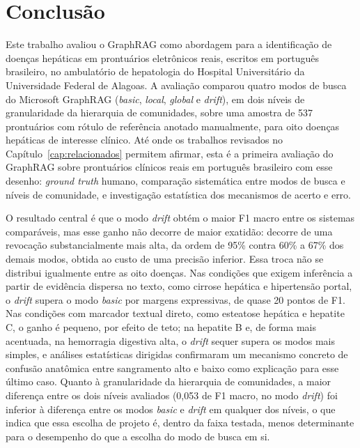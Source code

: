 \chapter{Conclusão}\label{cap:conclusao}

Este trabalho avaliou o GraphRAG como abordagem para a identificação de doenças hepáticas em prontuários eletrônicos reais, escritos em português brasileiro, no ambulatório de hepatologia do Hospital Universitário da Universidade Federal de Alagoas. A avaliação comparou quatro modos de busca do Microsoft GraphRAG (\textit{basic}, \textit{local}, \textit{global} e \textit{drift}), em dois níveis de granularidade da hierarquia de comunidades, sobre uma amostra de 537 prontuários com rótulo de referência anotado manualmente, para oito doenças hepáticas de interesse clínico. Até onde os trabalhos revisados no Capítulo~\ref{cap:relacionados} permitem afirmar, esta é a primeira avaliação do GraphRAG sobre prontuários clínicos reais em português brasileiro com esse desenho: \textit{ground truth} humano, comparação sistemática entre modos de busca e níveis de comunidade, e investigação estatística dos mecanismos de acerto e erro.

O resultado central é que o modo \textit{drift} obtém o maior F1 macro entre os sistemas comparáveis, mas esse ganho não decorre de maior exatidão: decorre de uma revocação substancialmente mais alta, da ordem de 95\% contra 60\% a 67\% dos demais modos, obtida ao custo de uma precisão inferior. Essa troca não se distribui igualmente entre as oito doenças. Nas condições que exigem inferência a partir de evidência dispersa no texto, como cirrose hepática e hipertensão portal, o \textit{drift} supera o modo \textit{basic} por margens expressivas, de quase 20 pontos de F1. Nas condições com marcador textual direto, como esteatose hepática e hepatite C, o ganho é pequeno, por efeito de teto; na hepatite B e, de forma mais acentuada, na hemorragia digestiva alta, o \textit{drift} sequer supera os modos mais simples, e análises estatísticas dirigidas confirmaram um mecanismo concreto de confusão anatômica entre sangramento alto e baixo como explicação para esse último caso. Quanto à granularidade da hierarquia de comunidades, a maior diferença entre os dois níveis avaliados (0,053 de F1 macro, no modo \textit{drift}) foi inferior à diferença entre os modos \textit{basic} e \textit{drift} em qualquer dos níveis, o que indica que essa escolha de projeto é, dentro da faixa testada, menos determinante para o desempenho do que a escolha do modo de busca em si.

